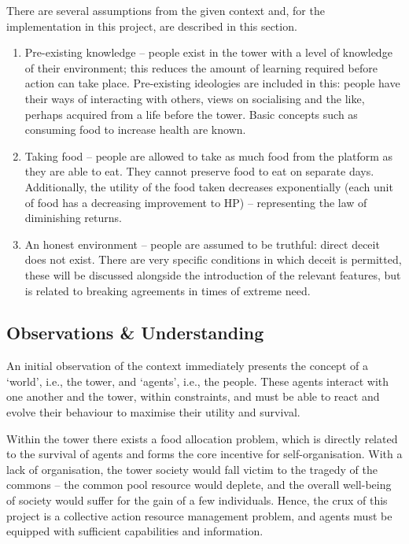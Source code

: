 There are several assumptions from the given context and, for the implementation in this project, are described in this section.

\begin{enumerate}
    \item  Pre-existing knowledge -- people exist in the tower with a level of knowledge of their environment; this reduces the amount of learning required before action can take place. Pre-existing ideologies are included in this: people have their ways of interacting with others, views on socialising and the like, perhaps acquired from a life before the tower.
     Basic concepts such as consuming food to increase health are known.
      \item  Taking food -- people are allowed to take as much food from the platform as they are able to eat. They cannot preserve food to eat on separate days. Additionally, the utility of the food taken decreases exponentially (each unit of food has a decreasing improvement to HP) -- representing the law of diminishing returns.
      \item An honest environment -- people are assumed to be truthful: direct deceit does not exist. There are very specific conditions in which deceit is permitted, these will be discussed alongside the introduction of the relevant features, but is related to breaking agreements in times of extreme need.

\end{enumerate}

\subsection{Observations \& Understanding}

An initial observation of the context immediately presents the concept of a `world', i.e., the tower, and `agents', i.e.,  the people. These agents interact with one another and the tower, within constraints, and must be able to react and evolve their behaviour to maximise their utility and survival.
 
 
Within the tower there exists a food allocation problem, which is directly related to the survival of agents and forms the core incentive for self-organisation. With a lack of organisation, the tower society would fall victim to the tragedy of the commons -- the common pool resource would deplete, and the overall well-being of society would suffer for the gain of a few individuals. Hence, the crux of this project is a collective action resource management problem, and agents must be equipped with sufficient capabilities and information.
 
